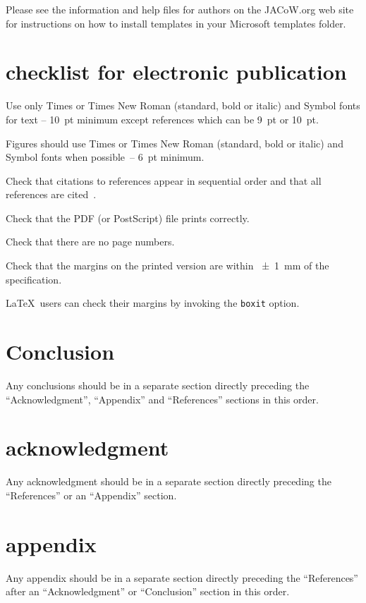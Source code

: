 \documentclass[a4paper]{jacow}
\begin{document}
Please see the information and help files for authors on the JACoW.org web site
for instructions  on  how to install templates in your Microsoft templates folder.



\section{checklist for electronic publication}

\begin{Itemize}
    \item  Use only Times or Times New Roman (standard, bold or italic) and Symbol
           fonts for text -- \SI{10}{pt} minimum except references which can be \SI{9}{pt} or \SI{10}{pt}.
    \item  Figures should use Times or Times New Roman (standard, bold or italic) and
           Symbol fonts when possible~-- \SI{6}{pt} minimum.
    \item  Check that citations to references appear in sequential order and
           that all references are cited~\cite{exampl-ref11}.
    \item  Check that the PDF (or PostScript) file prints correctly.
    \item  Check that there are no page numbers.
    \item  Check that the margins on the printed version are within \SI{\pm1}{mm}
           of the specification.
    \item  \LaTeX\ users can check their margins by invoking the
           \texttt{boxit} option.
\end{Itemize}

\section{Conclusion}

Any conclusions should be in a separate section directly preceding
the \enquote{Acknowledgment}, \enquote{Appendix} and \enquote{References} sections in this
order.

\section{acknowledgment}
Any acknowledgment should be in a separate section directly preceding
the \enquote{References} or an \enquote{Appendix} section.

\section{appendix}
Any appendix should be in a separate section directly preceding
the \enquote{References} after an \enquote{Acknowledgment} or \enquote{Conclusion} section
in this order.
\end{document}
